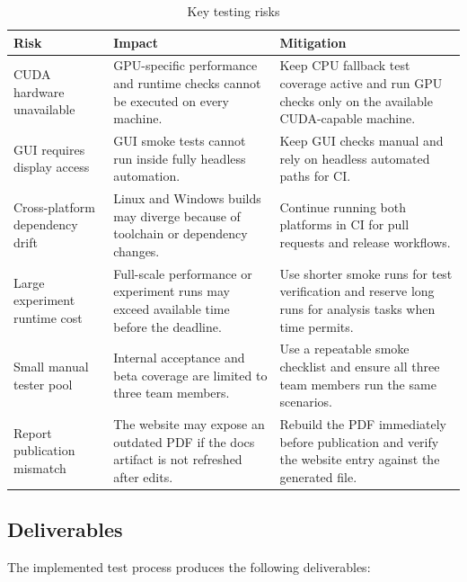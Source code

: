 \begin{table}[H]
	\centering
	\caption{Key testing risks}
	\label{tab:risks}
	\begin{tabularx}{\textwidth}{@{}>{\ttfamily\small}lX X@{}}
		\toprule
		\textbf{Risk}                   & \textbf{Impact}                                                                           & \textbf{Mitigation}                                                                                      \\
		\midrule
		CUDA hardware unavailable       & GPU-specific performance and runtime checks cannot be executed on every machine.          & Keep CPU fallback test coverage active and run GPU checks only on the available CUDA-capable machine.    \\
		GUI requires display access     & GUI smoke tests cannot run inside fully headless automation.                              & Keep GUI checks manual and rely on headless automated paths for CI.                                      \\
		Cross-platform dependency drift & Linux and Windows builds may diverge because of toolchain or dependency changes.          & Continue running both platforms in CI for pull requests and release workflows.                           \\
		Large experiment runtime cost   & Full-scale performance or experiment runs may exceed available time before the deadline.  & Use shorter smoke runs for test verification and reserve long runs for analysis tasks when time permits. \\
		Small manual tester pool        & Internal acceptance and beta coverage are limited to three team members.                  & Use a repeatable smoke checklist and ensure all three team members run the same scenarios.               \\
		Report publication mismatch     & The website may expose an outdated PDF if the docs artifact is not refreshed after edits. & Rebuild the PDF immediately before publication and verify the website entry against the generated file.  \\
		\bottomrule
	\end{tabularx}
\end{table}

\subsection{Deliverables}

The implemented test process produces the following deliverables:

